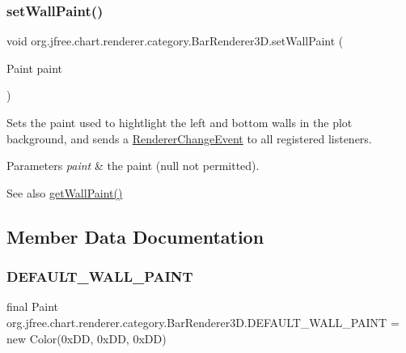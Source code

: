 \subsubsection{\texorpdfstring{set\+Wall\+Paint()}{setWallPaint()}}
{\footnotesize\ttfamily void org.\+jfree.\+chart.\+renderer.\+category.\+Bar\+Renderer3\+D.\+set\+Wall\+Paint (\begin{DoxyParamCaption}\item[{Paint}]{paint }\end{DoxyParamCaption})}

Sets the paint used to hightlight the left and bottom walls in the plot background, and sends a \mbox{\hyperlink{}{Renderer\+Change\+Event}} to all registered listeners.


\begin{DoxyParams}{Parameters}
{\em paint} & the paint ({\ttfamily null} not permitted).\\
\hline
\end{DoxyParams}
\begin{DoxySeeAlso}{See also}
\mbox{\hyperlink{classorg_1_1jfree_1_1chart_1_1renderer_1_1category_1_1_bar_renderer3_d_a4d133ebfc6791eb558ef58409fc69cc5}{get\+Wall\+Paint()}} 
\end{DoxySeeAlso}


\subsection{Member Data Documentation}
\mbox{\label{classorg_1_1jfree_1_1chart_1_1renderer_1_1category_1_1_bar_renderer3_d_a1772f04c3b41a44088f0f73c813c39aa}} 
\subsubsection{\texorpdfstring{D\+E\+F\+A\+U\+L\+T\+\_\+\+W\+A\+L\+L\+\_\+\+P\+A\+I\+NT}{DEFAULT\_WALL\_PAINT}}
{\footnotesize\ttfamily final Paint org.\+jfree.\+chart.\+renderer.\+category.\+Bar\+Renderer3\+D.\+D\+E\+F\+A\+U\+L\+T\+\_\+\+W\+A\+L\+L\+\_\+\+P\+A\+I\+NT = new Color(0x\+D\+D, 0x\+D\+D, 0x\+D\+D)\hspace{0.3cm}{\ttfamily [static]}}

